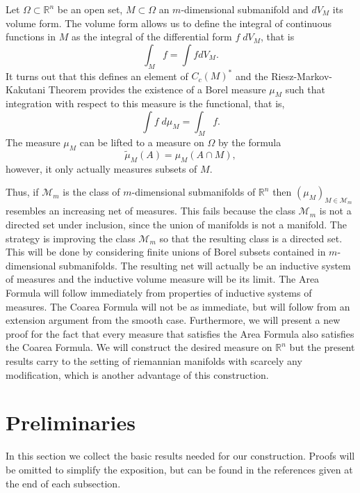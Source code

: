 \documentclass[%
 aip,
 amsmath,amssymb,
 reprint,%
jmp]{revtex4-2}
\begin{document}
Let $\Omega\subset\mathbb{R}^{n}$ be an open set, $M\subset \Omega$ an $m$-dimensional submanifold and $dV_{M}$ its volume form. The volume form allows us to define the integral of continuous functions in $M$ as the integral of the differential form $f\;dV_{M}$, that is
\begin{equation*}
    \int_{M} f = \int fdV_{M}.
\end{equation*}
It turns out that this defines an element of $C_{c}(M)^{\ast}$ and the Riesz-Markov-Kakutani Theorem provides the existence of a Borel measure $\mu_{M}$ such that integration with respect to this measure is the functional, that is,
\begin{equation*}
    \int f\;d\mu_{M} = \int_{M} f.
\end{equation*}
The measure $\mu_{M}$ can be lifted to a measure on $\Omega$ by the formula
\begin{equation*}
    \tilde{\mu}_{M}(A) = \mu_{M}(A\cap M),
\end{equation*}
however, it only actually measures subsets of $M$. 

Thus, if $\mathcal{M}_{m}$ is the class of $m$-dimensional submanifolds of $\mathbb{R}^{n}$ then $(\mu_{M})_{M\in\mathcal{M}_{m}}$ resembles an increasing net of measures. This fails because the class $\mathcal{M}_{m}$ is not a directed set under inclusion, since the union of manifolds is not a manifold. The strategy is improving the class $\mathcal{M}_{m}$ so that the resulting class is a directed set. This will be done by considering finite unions of Borel subsets contained in $m$-dimensional submanifolds. The resulting net will actually be an inductive system of measures and the inductive volume measure will be its limit. The Area Formula will follow immediately from properties of inductive systems of measures. The Coarea Formula will not be as immediate, but will follow from an extension argument from the smooth case. Furthermore, we will present a new proof for the fact that every measure that satisfies the Area Formula also satisfies the Coarea Formula. We will construct the desired measure on $\mathbb{R}^{n}$ but the present results carry to the setting of riemannian manifolds with scarcely any modification, which is another advantage of this construction.

\section{Preliminaries}

In this section we collect the basic results needed for our construction. Proofs will be omitted to simplify the exposition, but can be found in the references given at the end of each subsection.
\end{document}
